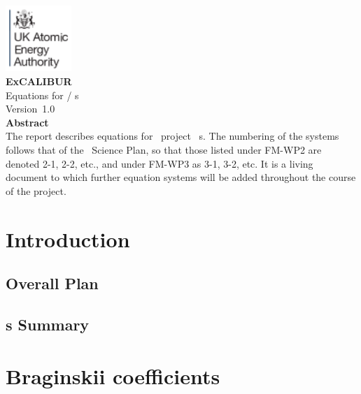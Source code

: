 \documentclass[11pt,twoside,a4paper]{article}
\newcommand{\culhamtitle}{\LARGE Equations for \exc/\nep \; \Papp s  \\[1.0\baselineskip] Version~1.0 }%
\begin{document}
\begin{titlepage}%
\vspace*{-30mm}%
\includegraphics[width=2.5cm]{../corpics/cofaplus} \\[2.0\baselineskip]%
{\LARGE {\textbf{\textsf{ExCALIBUR}}}}\\[2.0\baselineskip]%
{\LARGE \culhamtitle } \\[2.0\baselineskip]%
{\textbf{\textsf{Abstract}}}\\%
The report describes equations for \exc \ project \nep \ \Papp s.  %
The numbering of the systems follows that of the \nep\ Science Plan, so %
that those listed under FM-WP2 are denoted 2-1, 2-2, etc., and %
under FM-WP3 as 3-1, 3-2, etc. It is a living document to which further equation %
systems will be added throughout the course of the project.%
\end{titlepage}%



\clearpage
\section{Introduction}\label{sec:intro}

\subsection{Overall Plan}\label{sec:plana}

\subsection{\Papp s Summary}\label{sec:papp}

\section{Braginskii coefficients}\label{sec:bragin}

\clearpage
\end{document}
